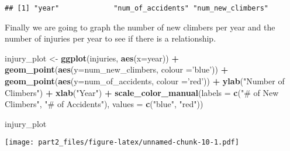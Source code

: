 \documentclass[]{article}
\newenvironment{Shaded}{\begin{snugshade}}{\end{snugshade}}
\newcommand{\DataTypeTok}[1]{\textcolor[rgb]{0.13,0.29,0.53}{#1}}
\newcommand{\KeywordTok}[1]{\textcolor[rgb]{0.13,0.29,0.53}{\textbf{#1}}}
\newcommand{\NormalTok}[1]{#1}
\newcommand{\OperatorTok}[1]{\textcolor[rgb]{0.81,0.36,0.00}{\textbf{#1}}}
\newcommand{\StringTok}[1]{\textcolor[rgb]{0.31,0.60,0.02}{#1}}
\begin{document}
\begin{verbatim}
## [1] "year"             "num_of_accidents" "num_new_climbers"
\end{verbatim}

Finally we are going to graph the number of new climbers per year and
the number of injuries per year to see if there is a relationship.

\begin{Shaded}
\begin{Highlighting}[]
\NormalTok{injury_plot <-}\StringTok{ }\KeywordTok{ggplot}\NormalTok{(injuries, }\KeywordTok{aes}\NormalTok{(}\DataTypeTok{x=}\NormalTok{year)) }\OperatorTok{+}\StringTok{ }\KeywordTok{geom_point}\NormalTok{(}\KeywordTok{aes}\NormalTok{(}\DataTypeTok{y=}\NormalTok{num_new_climbers, }\DataTypeTok{colour =}\StringTok{'blue'}\NormalTok{)) }\OperatorTok{+}
\StringTok{    }\KeywordTok{geom_point}\NormalTok{(}\KeywordTok{aes}\NormalTok{(}\DataTypeTok{y=}\NormalTok{num_of_accidents, }\DataTypeTok{colour =}\StringTok{'red'}\NormalTok{)) }\OperatorTok{+}\StringTok{ }\KeywordTok{ylab}\NormalTok{(}\StringTok{"Number of Climbers"}\NormalTok{) }\OperatorTok{+}\StringTok{ }\KeywordTok{xlab}\NormalTok{(}\StringTok{"Year"}\NormalTok{) }\OperatorTok{+}\StringTok{    }\KeywordTok{scale_color_manual}\NormalTok{(}\DataTypeTok{labels =} \KeywordTok{c}\NormalTok{(}\StringTok{"# of New Climbers"}\NormalTok{, }\StringTok{"# of Accidents"}\NormalTok{), }\DataTypeTok{values =} \KeywordTok{c}\NormalTok{(}\StringTok{"blue"}\NormalTok{, }\StringTok{"red"}\NormalTok{))}

\NormalTok{injury_plot}
\end{Highlighting}
\end{Shaded}

\texttt{[image: part2\_files/figure-latex/unnamed-chunk-10-1.pdf]}
\end{document}
